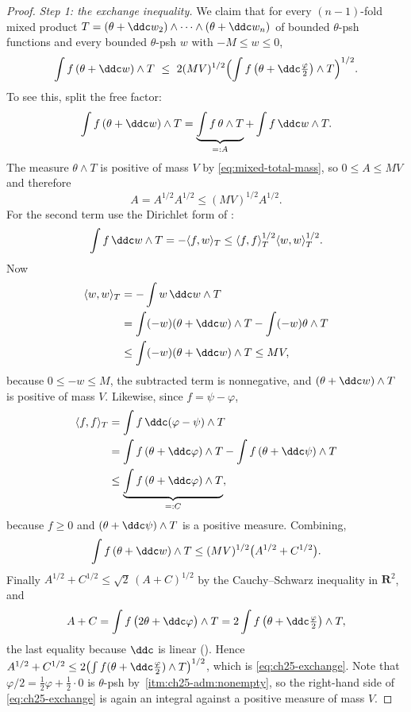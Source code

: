 \begin{proof}
\emph{Step 1: the exchange inequality.}  We claim that for every
\((n-1)\)-fold mixed product
\(T=(\theta+\ddc w_2)\wedge\cdots\wedge(\theta+\ddc w_n)\) of bounded
\(\theta\)-psh functions and every bounded \(\theta\)-psh \(w\) with
\(-M\leq w\leq0\),
\begin{equation}
\label{eq:ch25-exchange}
 \int f\,(\theta+\ddc w)\wedge T
 \ \leq\ 2(MV)^{1/2}
   \Bigl(\int f\,\bigl(\theta+\ddc\tfrac\varphi2\bigr)\wedge T\Bigr)^{1/2}.
\end{equation}
To see this, split the free factor:
\[
 \int f\,(\theta+\ddc w)\wedge T
 =\underbrace{\int f\,\theta\wedge T}_{=:A}
  +\int f\,\ddc w\wedge T .
\]
The measure \(\theta\wedge T\) is positive of mass \(V\) by
\eqref{eq:mixed-total-mass}, so \(0\leq A\leq MV\) and therefore
\begin{equation}
\label{eq:ch25-A-term}
 A=A^{1/2}A^{1/2}\leq(MV)^{1/2}A^{1/2}.
\end{equation}
For the second term use the Dirichlet form of
:
\[
 \int f\,\ddc w\wedge T=-\langle f,w\rangle_T
 \leq\langle f,f\rangle_T^{1/2}\langle w,w\rangle_T^{1/2}.
\]
Now
\[
 \begin{aligned}
 \langle w,w\rangle_T
 &=-\int w\,\ddc w\wedge T\\
 &=\int(-w)(\theta+\ddc w)\wedge T-\int(-w)\theta\wedge T\\
 &\leq\int(-w)(\theta+\ddc w)\wedge T\leq MV,
 \end{aligned}
\]
because \(0\leq-w\leq M\), the subtracted term is nonnegative, and
\((\theta+\ddc w)\wedge T\) is positive of mass \(V\).  Likewise, since
\(f=\psi-\varphi\),
\[
 \begin{aligned}
 \langle f,f\rangle_T
 &=\int f\,\ddc(\varphi-\psi)\wedge T\\
 &=\int f\,(\theta+\ddc\varphi)\wedge T
   -\int f\,(\theta+\ddc\psi)\wedge T\\
 &\leq\underbrace{\int f\,(\theta+\ddc\varphi)\wedge T}_{=:C},
 \end{aligned}
\]
because \(f\geq0\) and \((\theta+\ddc\psi)\wedge T\) is a positive measure.
Combining,
\[
 \int f\,(\theta+\ddc w)\wedge T\leq(MV)^{1/2}\bigl(A^{1/2}+C^{1/2}\bigr).
\]
Finally \(A^{1/2}+C^{1/2}\leq\sqrt2\,(A+C)^{1/2}\) by the
Cauchy--Schwarz inequality in \(\mathbf R^2\), and
\[
 A+C=\int f\,\bigl(2\theta+\ddc\varphi\bigr)\wedge T
 =2\int f\,\bigl(\theta+\ddc\tfrac\varphi2\bigr)\wedge T ,
\]
the last equality because \(\ddc\) is linear
().  Hence
\(A^{1/2}+C^{1/2}\leq2\bigl(\int f(\theta+\ddc\frac\varphi2)\wedge
T\bigr)^{1/2}\), which is \eqref{eq:ch25-exchange}.  Note that
\(\varphi/2=\frac12\varphi+\frac12\cdot0\) is \(\theta\)-psh by
\,\cref{itm:ch25-adm:nonempty}, so the
right-hand side of \eqref{eq:ch25-exchange} is again an integral against a
positive measure of mass \(V\).


\end{proof}
